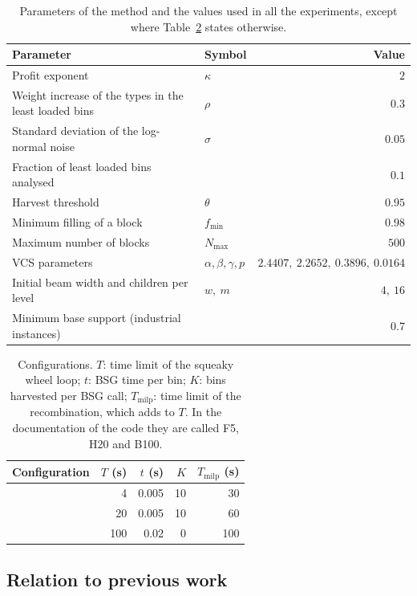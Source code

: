 \begin{table}[t]
\centering
\caption{Parameters of the method and the values used in all the experiments, except where
Table~\ref{tab:configs} states otherwise.}
\label{tab:params}
\begin{tabular}{@{}llr@{}}
\toprule
Parameter & Symbol & Value\\
\midrule
Profit exponent & $\kappa$ & $2$\\
Weight increase of the types in the least loaded bins & $\rho$ & $0.3$\\
Standard deviation of the log-normal noise & $\sigma$ & $0.05$\\
Fraction of least loaded bins analysed & & $0.1$\\
Harvest threshold & $\theta$ & $0.95$\\
Minimum filling of a block & $f_{\min}$ & $0.98$\\
Maximum number of blocks & $N_{\max}$ & $500$\\
VCS parameters & $\alpha,\beta,\gamma,p$ & $2.4407,\ 2.2652,\ 0.3896,\ 0.0164$\\
Initial beam width and children per level & $w,\ m$ & $4,\ 16$\\
Minimum base support (industrial instances) & & $0.7$\\
\bottomrule
\end{tabular}
\end{table}

\begin{table}[t]
\centering
\caption{Configurations. $T$: time limit of the squeaky wheel loop; $t$: BSG time per bin;
$K$: bins harvested per BSG call; $T_{\mathrm{milp}}$: time limit of the recombination, which adds to $T$.
In the documentation of the code they are called F5, H20 and B100.}
\label{tab:configs}
\begin{tabular}{@{}lrrrr@{}}
\toprule
Configuration & $T$ (s) & $t$ (s) & $K$ & $T_{\mathrm{milp}}$ (s)\\
\midrule
\cfgfast{}   & 4   & 0.005 & 10 & 30\\
\cfgbal{}  & 20  & 0.005 & 10 & 60\\
\cfgqual{} & 100 & 0.02  & 0  & 100\\
\bottomrule
\end{tabular}
\end{table}

\subsection{Relation to previous work}
\label{sec:m-related}

